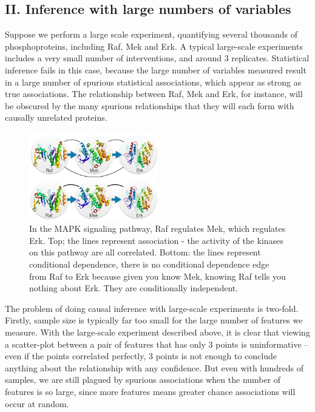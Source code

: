 \documentclass[journal=jacsat,manuscript=article]{achemso}
\begin{document}
\subsection{II. Inference with large numbers of variables}


Suppose we perform a large scale experiment, quantifying several
thousands of phosphoproteins, including Raf, Mek and Erk. A typical
large-scale experiments includes a very small number of interventions,
and around 3 replicates. Statistical inference fails in this case,
because the large number of variables measured result in a large number
of spurious statistical associations, which appear as strong as true
associations. The relationship between Raf, Mek and Erk, for instance,
will be obscured by the many spurious relationships that they will each
form with causally unrelated proteins.

\begin{figure}[!tpb]
\centerline{\includegraphics[width=0.5\textwidth]{figs/mapk.jpg}}
\caption{In the MAPK signaling pathway, Raf regulates Mek, which regulates
Erk. Top; the lines represent association - the activity of the kinases
on this pathway are all correlated. Bottom: the lines represent
conditional dependence, there is no conditional dependence edge from Raf
to Erk because given you know Mek, knowing Raf tells you nothing about
Erk. They are conditionally independent.}
\label{mapk}
\end{figure}

The problem of doing causal inference with large-scale experiments is
two-fold. Firstly, sample size is typically far too small for the large
number of features we measure. With the large-scale experiment described
above, it is clear that viewing a scatter-plot between a pair of
features that has only 3 points is uninformative -- even if the points
correlated perfectly, 3 points is not enough to conclude anything about
the relationship with any confidence. But even with hundreds of samples,
we are still plagued by spurious associations when the number of
features is so large, since more features means greater chance
associations will occur at random.
\end{document}

